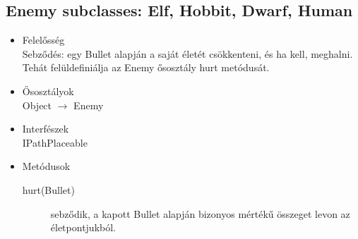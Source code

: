 \subsection{Enemy subclasses: Elf, Hobbit, Dwarf, Human}
\begin{itemize}
\item Felelősség\\
Sebződés: egy Bullet alapján a saját életét csökkenteni, és ha kell, meghalni. Tehát felüldefiniálja az Enemy ősosztály hurt metódusát.
\item Ősosztályok\\
Object $\rightarrow$ Enemy
\item Interfészek\\
IPathPlaceable

\item Metódusok\\
	\begin{description}
		\item[hurt(Bullet)] sebződik, a kapott Bullet alapján bizonyos mértékű összeget levon az életpontjukból.
		
	\end{description}
\end{itemize}



